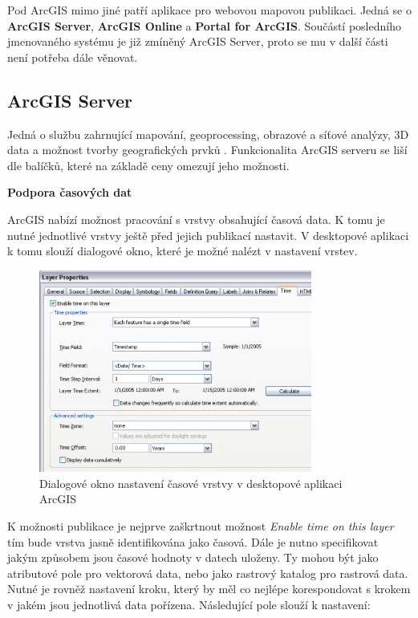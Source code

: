 Pod ArcGIS mimo jiné patří aplikace pro webovou mapovou
publikaci. Jedná se o \textbf{ArcGIS Server}, \textbf{ArcGIS Online} a
\textbf{Portal for ArcGIS}. Součástí posledního jmenovaného systému je
již zmíněný ArcGIS Server, proto se mu v další části není potřeba dále
věnovat.

\newpage
\subsection{ArcGIS Server}

Jedná o službu zahrnující mapování, geoprocessing, obrazové a síťové
analýzy, 3D data a možnost tvorby geografických prvků
\cite{arcgis-publishing-service}. Funkcionalita ArcGIS serveru se liší
dle balíčků, které na základě ceny omezují jeho možnosti.

\bigskip
\noindent \textbf{Podpora časových dat}
 
ArcGIS nabízí možnost pracování s vrstvy obsahující časová data. K
tomu je nutné jednotlivé vrstvy ještě před jejich publikací
nastavit. V desktopové aplikaci k tomu slouží dialogové okno, které je
možné nalézt v nastavení vrstev.

\begin{figure}[h!]  \centering
\includegraphics[width=0.8\textwidth]{../img/arcgis-layer-edit.png}
	\caption{Dialogové okno nastavení časové vrstvy v desktopové
aplikaci ArcGIS}
	\label{fig:arcgis-time-settings}
\end{figure}

K možnosti publikace je nejprve zaškrtnout možnost \textit{Enable time
on this layer} tím bude vrstva jasně identifikována jako časová. Dále
je nutno specifikovat jakým způsobem jsou časové hodnoty v datech
uloženy. Ty mohou být jako atributové pole pro vektorová data, nebo
jako rastrový katalog pro rastrová data. Nutné je rovněž nastavení
kroku, který by měl co nejlépe korespondovat s krokem v jakém jsou
jednotlivá data pořízena. Následující pole slouží k nastavení:

